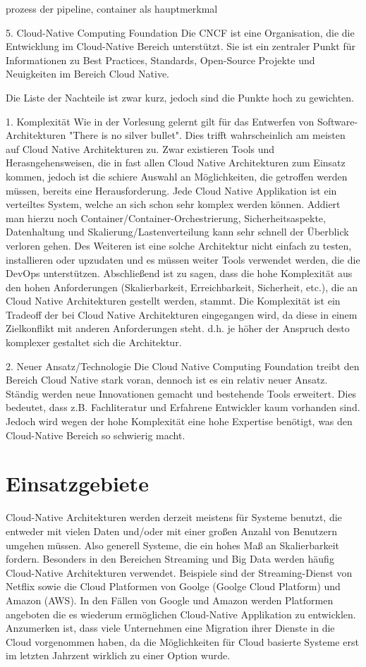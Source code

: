 prozess der pipeline, container als hauptmerkmal

5. Cloud-Native Computing Foundation
Die CNCF ist eine Organisation, die die Entwicklung im Cloud-Native Bereich unterstützt. Sie ist ein zentraler Punkt für Informationen zu Best Practices, Standards, Open-Source Projekte und Neuigkeiten im Bereich Cloud Native.

Die Liste der Nachteile ist zwar kurz, jedoch sind die Punkte hoch zu gewichten.

1. Komplexität
Wie in der Vorlesung gelernt gilt für das Entwerfen von Software-Architekturen "There is no silver bullet". Dies trifft wahrscheinlich am meisten auf Cloud Native Architekturen zu. Zwar existieren Tools und Herasngehensweisen, die in fast allen Cloud Native Architekturen zum Einsatz kommen, jedoch ist die schiere Auswahl an Möglichkeiten, die getroffen werden müssen, bereits eine Herausforderung. 
Jede Cloud Native Applikation ist ein verteiltes System, welche an sich schon sehr komplex werden können. Addiert man hierzu noch Container/Container-Orchestrierung, Sicherheitsaspekte, Datenhaltung und Skalierung/Lastenverteilung kann sehr schnell der Überblick verloren gehen. Des Weiteren ist eine solche Architektur nicht einfach zu testen, installieren oder upzudaten und es müssen weiter Tools verwendet werden, die die DevOps unterstützen.
Abschließend ist zu sagen, dass die hohe Komplexität aus den hohen Anforderungen (Skalierbarkeit, Erreichbarkeit, Sicherheit, etc.), die an Cloud Native Architekturen gestellt werden, stammt. Die Komplexität ist ein Tradeoff der bei Cloud Native Architekturen eingegangen wird, da diese in einem Zielkonflikt mit anderen Anforderungen steht. d.h. je höher der Anspruch desto komplexer gestaltet sich die Architektur.


2. Neuer Ansatz/Technologie
Die Cloud Native Computing Foundation treibt den Bereich Cloud Native stark voran, dennoch ist es ein relativ neuer Ansatz. Ständig werden neue Innovationen gemacht und bestehende Tools erweitert. Dies bedeutet, dass z.B. Fachliteratur und Erfahrene Entwickler kaum vorhanden sind. Jedoch wird wegen der hohe Komplexität eine hohe Expertise benötigt, was den Cloud-Native Bereich so schwierig macht.


\section{Einsatzgebiete}
Cloud-Native Architekturen werden derzeit meistens für Systeme benutzt, die entweder mit vielen Daten und/oder mit einer großen Anzahl von Benutzern umgehen müssen. Also generell Systeme, die ein hohes Maß an Skalierbarkeit fordern. Besonders in den Bereichen Streaming und Big Data werden häufig Cloud-Native Architekturen verwendet. 
Beispiele sind der Streaming-Dienst von Netflix sowie die Cloud Platformen von Goolge (Goolge Cloud Platform) und Amazon (AWS). In den Fällen von Google und Amazon werden Platformen angeboten die es wiederum ermöglichen Cloud-Native Applikation zu entwicklen.
Anzumerken ist, dass viele Unternehmen eine Migration ihrer Dienste in die Cloud vorgenommen haben, da die Möglichkeiten für Cloud basierte Systeme erst im letzten Jahrzent wirklich zu einer Option wurde. 